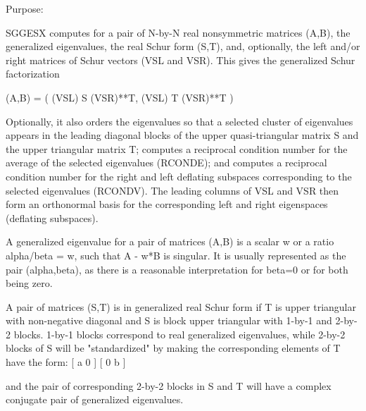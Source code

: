  \begin{DoxyParagraph}{Purpose\+: }
\begin{DoxyVerb} SGGESX computes for a pair of N-by-N real nonsymmetric matrices
 (A,B), the generalized eigenvalues, the real Schur form (S,T), and,
 optionally, the left and/or right matrices of Schur vectors (VSL and
 VSR).  This gives the generalized Schur factorization

      (A,B) = ( (VSL) S (VSR)**T, (VSL) T (VSR)**T )

 Optionally, it also orders the eigenvalues so that a selected cluster
 of eigenvalues appears in the leading diagonal blocks of the upper
 quasi-triangular matrix S and the upper triangular matrix T; computes
 a reciprocal condition number for the average of the selected
 eigenvalues (RCONDE); and computes a reciprocal condition number for
 the right and left deflating subspaces corresponding to the selected
 eigenvalues (RCONDV). The leading columns of VSL and VSR then form
 an orthonormal basis for the corresponding left and right eigenspaces
 (deflating subspaces).

 A generalized eigenvalue for a pair of matrices (A,B) is a scalar w
 or a ratio alpha/beta = w, such that  A - w*B is singular.  It is
 usually represented as the pair (alpha,beta), as there is a
 reasonable interpretation for beta=0 or for both being zero.

 A pair of matrices (S,T) is in generalized real Schur form if T is
 upper triangular with non-negative diagonal and S is block upper
 triangular with 1-by-1 and 2-by-2 blocks.  1-by-1 blocks correspond
 to real generalized eigenvalues, while 2-by-2 blocks of S will be
 "standardized" by making the corresponding elements of T have the
 form:
         [  a  0  ]
         [  0  b  ]

 and the pair of corresponding 2-by-2 blocks in S and T will have a
 complex conjugate pair of generalized eigenvalues.\end{DoxyVerb}
 
\end{DoxyParagraph}


